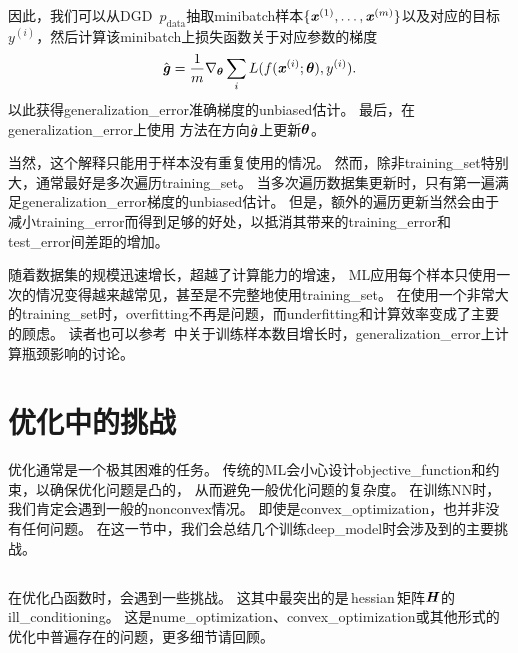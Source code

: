 因此，我们可以从\gls{DGD}~$p_\text{data}$抽取\gls{minibatch}样本$\{ \boldsymbol{\mathit{x}}^{(1)}, \dots,\boldsymbol{\mathit{x}}^{(m)} \}$以及对应的目标$y^{(i)}$，然后计算该\gls{minibatch}上损失函数关于对应参数的梯度
\begin{equation}
\label{eq:8.9}
    \hat{\boldsymbol{\mathit{g}}} = \frac{1}{m} \nabla_{\boldsymbol{\theta}} \sum_i L(f(\boldsymbol{\mathit{x}}^{(i)};\boldsymbol{\theta}),y^{(i)} ).
\end{equation}
以此获得\gls{generalization_error}准确梯度的\gls{unbiased}估计。
最后，在\gls{generalization_error}上使用\,\,方法在方向$\hat{\boldsymbol{\mathit{g}}}$上更新$\boldsymbol{\theta}$。


当然，这个解释只能用于样本没有重复使用的情况。
然而，除非\gls{training_set}特别大，通常最好是多次遍历\gls{training_set}。
当多次遍历数据集更新时，只有第一遍满足\gls{generalization_error}梯度的\gls{unbiased}估计。
但是，额外的遍历更新当然会由于减小\gls{training_error}而得到足够的好处，以抵消其带来的\gls{training_error}和\gls{test_error}间差距的增加。


随着数据集的规模迅速增长，超越了计算能力的增速，
\gls{ML}应用每个样本只使用一次的情况变得越来越常见，甚至是不完整地使用\gls{training_set}。
在使用一个非常大的\gls{training_set}时，\gls{overfitting}不再是问题，而\gls{underfitting}和计算效率变成了主要的顾虑。
读者也可以参考~\cite{bottou-bousquet-2008}中关于训练样本数目增长时，\gls{generalization_error}上计算瓶颈影响的讨论。


\section{优化中的挑战}
\label{sec:challenges_in_neural_network_optimization}
优化通常是一个极其困难的任务。
传统的\gls{ML}会小心设计\gls{objective_function}和约束，以确保优化问题是凸的，
从而避免一般优化问题的复杂度。
在训练\gls{NN}时，我们肯定会遇到一般的\gls{nonconvex}情况。
即使是\gls{convex_optimization}，也并非没有任何问题。
在这一节中，我们会总结几个训练\gls{deep_model}时会涉及到的主要挑战。


\subsection{}
\label{sec:ill_conditioning}
在优化凸函数时，会遇到一些挑战。
这其中最突出的是\,\gls{hessian}\,矩阵$\boldsymbol{\mathit{H}}$的\gls{ill_conditioning}。
这是\gls{nume_optimization}、\gls{convex_optimization}或其他形式的优化中普遍存在的问题，更多细节请回顾。

